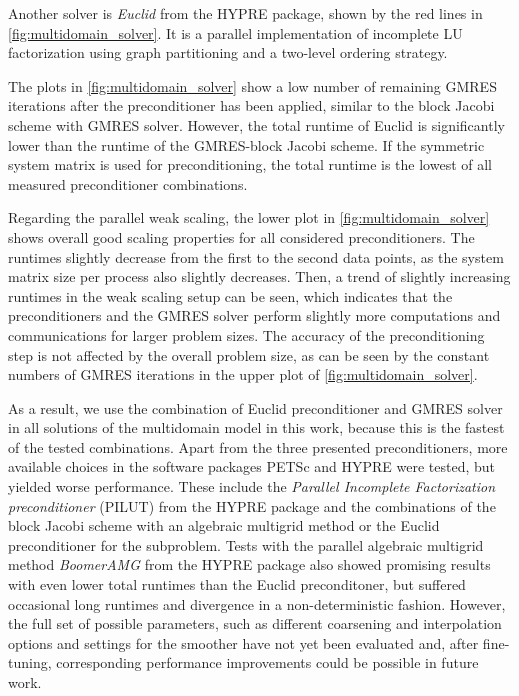 Another solver is \emph{Euclid} \cite{euclid} from the HYPRE package, shown by the red lines in \cref{fig:multidomain_solver}. It is a parallel implementation of incomplete LU factorization using graph partitioning and a two-level ordering strategy.

The plots in \cref{fig:multidomain_solver} show a low number of remaining GMRES iterations after the preconditioner has been applied, similar to the block Jacobi scheme with GMRES solver. However, the total runtime of Euclid is significantly lower than the runtime of the GMRES-block Jacobi scheme. If the symmetric system matrix is used for preconditioning, the total runtime is the lowest of all measured preconditioner combinations.

Regarding the parallel weak scaling, the lower plot in \cref{fig:multidomain_solver} shows overall good scaling properties for all considered preconditioners. The runtimes slightly decrease from the first to the second data points, as the system matrix size per process also slightly decreases. Then, a trend of slightly increasing runtimes in the weak scaling setup can be seen, which indicates that the preconditioners and the GMRES solver perform slightly more computations and communications for larger problem sizes. The accuracy of the preconditioning step is not affected by the overall problem size, as can be seen by the constant numbers of GMRES iterations in the upper plot of \cref{fig:multidomain_solver}.

As a result, we use the combination of Euclid preconditioner and GMRES solver in all solutions of the multidomain model in this work, because this is the fastest of the tested combinations. Apart from the three presented preconditioners, more available choices in the software packages PETSc and HYPRE were tested, but yielded worse performance. These include the \emph{Parallel Incomplete Factorization preconditioner} (PILUT) from the HYPRE package and the combinations of the block Jacobi scheme with an algebraic multigrid method or the Euclid preconditioner for the subproblem. Tests with the parallel algebraic multigrid method \emph{BoomerAMG} from the HYPRE package also showed promising results with even lower total runtimes than the Euclid preconditoner, but suffered occasional long runtimes and divergence in a non-deterministic fashion. However, the full set of possible parameters, such as different coarsening and interpolation options and settings for the smoother have not yet been evaluated and, after fine-tuning, corresponding performance improvements could be possible in future work.

